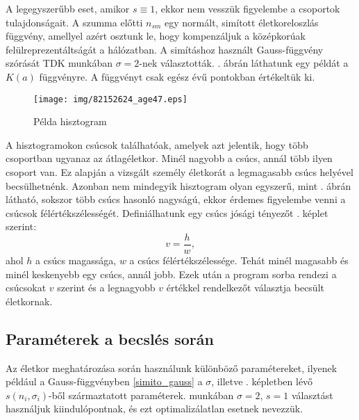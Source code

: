 \documentclass[12pt]{article}
\begin{document}
A legegyszerűbb eset, amikor $s\equiv 1$, ekkor nem vesszük figyelembe a csoportok tulajdonságait.
A szumma előtti $n_{sm}$ egy normált, simított életkoreloszlás függvény, amellyel azért osztunk le, hogy kompenzáljuk a középkorúak felülreprezentáltságát a hálózatban.
A simításhoz használt Gauss-függvény szórását  TDK munkában $\sigma=2$-nek választották. \iffalse TODO: ez lehet nem túl világos \fi {}. ábrán láthatunk egy példát a $K(a)$ függvényre. A függvényt csak egész évű pontokban értékeltük ki.
\begin{figure}[H]
	\centering
	\texttt{[image: img/82152624\_age47.eps]}
	\caption{Példa hisztogram} %
	\label{hisztogram_pelda}
\end{figure}
A hisztogramokon csúcsok találhatóak, amelyek azt jelentik, hogy több csoportban ugyanaz az átlagéletkor. Minél nagyobb a csúcs, annál több ilyen csoport van. Ez alapján a vizsgált személy életkorát a legmagasabb csúcs helyével becsülhetnénk. Azonban nem mindegyik hisztogram olyan egyszerű, mint . ábrán látható, sokszor több csúcs hasonló nagyságú, ekkor érdemes figyelembe venni a csúcsok félértékszélességét. Definiálhatunk egy csúcs jósági tényezőt . képlet szerint:
\begin{equation} \label{csucs_josag}
	v = \frac{h}{w},
\end{equation}
ahol $h$ a csúcs magassága, $w$ a csúcs félértékszélessége. Tehát minél magasabb és minél keskenyebb egy csúcs, annál jobb. Ezek után a program sorba rendezi a csúcsokat $v$ szerint és a legnagyobb $v$ értékkel rendelkezőt választja becsült életkornak.

\subsection{Paraméterek a becslés során}
Az életkor meghatározása során használunk különböző paramétereket, ilyenek például a Gauss-függvényben \eqref{simito_gauss} a $\sigma$\iffalse TODO: na jó nem biztos, hogy így szép \fi, illetve . képletben lévő $s(n_i, \sigma_i)$-ből származtatott paraméterek.  munkában $\sigma=2$, $s=1$ választást használjuk kiindulópontnak, és
ezt optimalizálatlan esetnek nevezzük.
\end{document}
